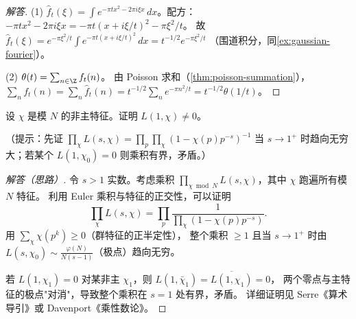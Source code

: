 \begin{proof}[解答]
(1) $\hat{f}_t(\xi) = \int e^{-\pi tx^2 - 2\pi i\xi x}\,dx$。配方：
$-\pi t x^2 - 2\pi i\xi x = -\pi t(x + i\xi/t)^2 - \pi\xi^2/t$。
故 $\hat{f}_t(\xi) = e^{-\pi\xi^2/t} \int e^{-\pi t(x+i\xi/t)^2}\,dx = t^{-1/2} e^{-\pi\xi^2/t}$
（围道积分，同\cref{ex:gaussian-fourier}）。

(2) $\theta(t) = \sum_{n \in \Z} f_t(n)$。
由 Poisson 求和（\cref{thm:poisson-summation}），
$\sum_n f_t(n) = \sum_n \hat{f}_t(n) = t^{-1/2}\sum_n e^{-\pi n^2/t} = t^{-1/2}\theta(1/t)$。
\end{proof}

\begin{exercise}
\label{ex:ch2-dirichlet-L-s1}
设 $\chi$ 是模 $N$ 的非主特征。证明 $L(1,\chi) \neq 0$。

（提示：先证 $\prod_\chi L(s,\chi) = \prod_p \prod_\chi (1 - \chi(p)p^{-s})^{-1}$
当 $s \to 1^+$ 时趋向无穷大；若某个 $L(1,\chi_0^{}) = 0$ 则乘积有界，矛盾。）
\end{exercise}

\begin{proof}[解答（思路）]
令 $s > 1$ 实数。考虑乘积
$\prod_{\chi \bmod N} L(s, \chi)$，其中 $\chi$ 跑遍所有模 $N$ 特征。
利用 Euler 乘积与特征的正交性，可以证明
\[
  \prod_{\chi} L(s, \chi) = \prod_{p} \frac{1}{\prod_\chi(1 - \chi(p)p^{-s})}.
\]
用 $\sum_\chi \chi(p^k) \geq 0$（群特征的正半定性），
整个乘积 $\geq 1$ 且当 $s \to 1^+$ 时由 $L(s, \chi_0) \sim \frac{\varphi(N)}{N(s-1)}$（极点）趋向无穷。

若 $L(1, \chi_1) = 0$ 对某非主 $\chi_1$，则 $L(1, \bar\chi_1) = \overline{L(1,\chi_1)} = 0$，
两个零点与主特征的极点"对消"，导致整个乘积在 $s = 1$ 处有界，矛盾。
详细证明见 Serre《算术导引》或 Davenport《乘性数论》。
\end{proof}
